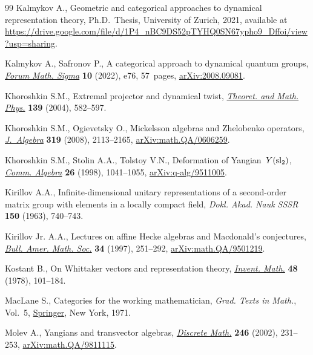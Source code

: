 \begin{thebibliography}{99}
Kalmykov A., Geometric and categorical approaches to dynamical representation theory, Ph.D.~Thesis, {U}niversity of Zurich, 2021, available at
 \url{https://drive.google.com/file/d/1P4_nBC9DS52pTYHQ0SN67ypho9_Dffoi/view?usp=sharing}.

Kalmykov A., Safronov P., A categorical approach to dynamical quantum groups,
 \href{https://doi.org/10.1017/fms.2022.68}{\textit{Forum Math. Sigma}} \textbf{10} (2022), e76, 57~pages,
 \href{https://arxiv.org/abs/2008.09081}{arXiv:2008.09081}.

Khoroshkin S.M., Extremal projector and dynamical twist, \href{https://doi.org/10.1023/B:TAMP.0000022749.42512.fd}{\textit{Theoret. and
 Math. Phys.}} \textbf{139} (2004), 582--597.

Khoroshkin S.M., Ogievetsky O., Mickelsson algebras and {Z}helobenko operators,
  \href{https://doi.org/10.1016/j.jalgebra.2007.04.020}{\textit{J.~Algebra}} \textbf{319} (2008), 2113--2165,
 \href{https://arxiv.org/abs/math.QA/0606259}{arXiv:math.QA/0606259}.

Khoroshkin S.M., Stolin A.A., Tolstoy V.N., Deformation of {Y}angian~{$Y({\rm
 sl}_2)$}, \href{https://doi.org/10.1080/00927879808826182}{\textit{Comm. Algebra}} \textbf{26} (1998), 1041--1055,
 \href{https://arxiv.org/abs/q-alg/9511005}{arXiv:q-alg/9511005}.

Kirillov A.A., Infinite-dimensional unitary representations of a second-order
 matrix group with elements in a locally compact field, \textit{Dokl. Akad.
 Nauk SSSR} \textbf{150} (1963), 740--743.

Kirillov Jr. A.A., Lectures on affine {H}ecke algebras and {M}acdonald's
 conjectures, \href{https://doi.org/10.1090/S0273-0979-97-00727-1}{\textit{Bull. Amer. Math. Soc.}} \textbf{34} (1997), 251--292,
 \href{https://arxiv.org/abs/math.QA/9501219}{arXiv:math.QA/9501219}.

Kostant B., On {W}hittaker vectors and representation theory, \href{https://doi.org/10.1007/BF01390249}{\textit{Invent.
 Math.}} \textbf{48} (1978), 101--184.

MacLane S., Categories for the working mathematician, \textit{Grad. Texts in
 Math.}, Vol.~5, \href{https://doi.org/10.1007/978-1-4757-4721-8}{Springer}, New York, 1971.

Molev A., Yangians and transvector algebras, \href{https://doi.org/10.1016/S0012-365X(01)00260-6}{\textit{Discrete Math.}} \textbf{246} (2002), 231--253,
 \href{https://arxiv.org/abs/math.QA/9811115}{arXiv:math.QA/9811115}.


\end{thebibliography}
